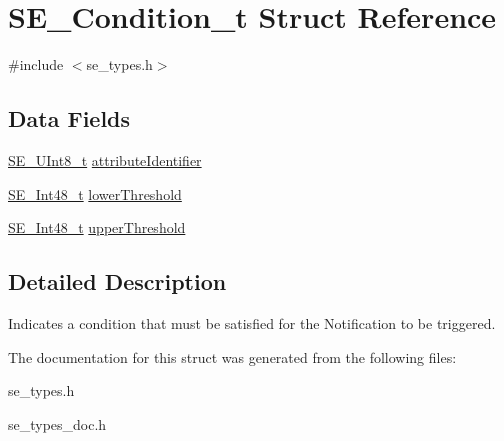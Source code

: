 \hypertarget{structSE__Condition__t}{}\section{S\+E\+\_\+\+Condition\+\_\+t Struct Reference}
\label{structSE__Condition__t}


{\ttfamily \#include $<$se\+\_\+types.\+h$>$}

\subsection*{Data Fields}
\begin{DoxyCompactItemize}
\item 
\hyperlink{group__UInt8_gaf7c365a1acfe204e3a67c16ed44572f5}{S\+E\+\_\+\+U\+Int8\+\_\+t} \hyperlink{group__Condition_ga0593335fc293cfbf8098ec85166a1d5b}{attribute\+Identifier}
\item 
\hyperlink{group__Int48_ga87620025dc9f6c732fa48fcab95861ce}{S\+E\+\_\+\+Int48\+\_\+t} \hyperlink{group__Condition_ga2b9831b649bb55a903934573c172e6a7}{lower\+Threshold}
\item 
\hyperlink{group__Int48_ga87620025dc9f6c732fa48fcab95861ce}{S\+E\+\_\+\+Int48\+\_\+t} \hyperlink{group__Condition_gacf1c0d2295665c535d75ae480fa2e373}{upper\+Threshold}
\end{DoxyCompactItemize}


\subsection{Detailed Description}
Indicates a condition that must be satisfied for the Notification to be triggered. 

The documentation for this struct was generated from the following files\+:\begin{DoxyCompactItemize}
\item 
se\+\_\+types.\+h\item 
se\+\_\+types\+\_\+doc.\+h\end{DoxyCompactItemize}
